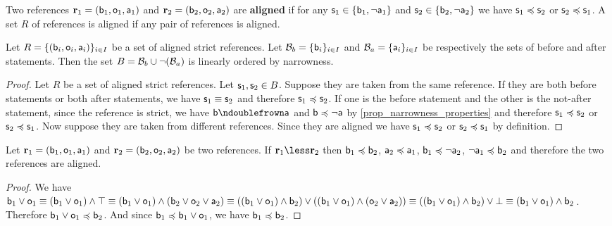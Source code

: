 \documentclass[11pt,letterpaper,fleqn]{memoir} %
\begin{document}
\begin{mathSection}
\begin{defn}
	Two references $\refStmt_1 = (\stmt[b]_1, \stmt[o]_1, \stmt[a]_1)$ and $\refStmt_2 = (\stmt[b]_2, \stmt[o]_2, \stmt[a]_2)$ are \textbf{aligned} if for any $\stmt_1 \in \{ \stmt[b]_1, \NOT\stmt[a]_1\}$ and $\stmt_2 \in \{ \stmt[b]_2, \NOT\stmt[a]_2\}$ we have 
	$\stmt_1 \narrower \stmt_2$ or $\stmt_2 \narrower \stmt_1$. A set $R$ of references is aligned if any pair of references is aligned.
\end{defn}
\begin{prop}\label{3_prop_strict_alignment_is_ordering}
	Let $R = \{(\stmt[b]_i, \stmt[o]_i, \stmt[a]_i)\}_{i\in I}$ be a set of aligned strict references. Let $\basis_b = \{\stmt[b]_i\}_{i\in I}$ and $\basis_a = \{\stmt[a]_i\}_{i\in I}$ be respectively the sets of before and after statements. Then the set $B = \basis_b \cup \NOT (\basis_a)$ is linearly ordered by narrowness.
\end{prop}
\begin{proof}
	Let $R$ be a set of aligned strict references. Let $\stmt_1, \stmt_2 \in B$. Suppose they are taken from the same reference. If they are both before statements or both after statements, we have $\stmt_1 \equiv \stmt_2$ and therefore $\stmt_1 \narrower \stmt_2$. If one is the before statement and the other is the not-after statement, since the reference is strict, we have $\stmt[b] \ncomp \stmt[a]$ and $\stmt[b] \narrower \NOT\stmt[a]$ by \ref{prop_narrowness_properties} and therefore $\stmt_1 \narrower \stmt_2$ or $\stmt_2 \narrower \stmt_1$. Now suppose they are taken from different references. Since they are aligned we have  $\stmt_1 \narrower \stmt_2$ or $\stmt_2 \narrower \stmt_1$ by definition.
\end{proof}

\begin{prop}\label{3_prop_ordered_references_are_aligned}
	Let $\refStmt_1 = ( \stmt[b]_1, \stmt[o]_1, \stmt[a]_1 )$ and $\refStmt_2 = ( \stmt[b]_2, \stmt[o]_2, \stmt[a]_2 )$ be two references. If $\refStmt_1 \less \refStmt_2$ then $\stmt[b]_1 \narrower \stmt[b]_2$, $\stmt[a]_2 \narrower \stmt[a]_1$, $\stmt[b]_1 \narrower \NOT \stmt[a]_2$, $\NOT \stmt[a]_1 \narrower \stmt[b]_2$ and therefore the two references are aligned.
\end{prop}
\begin{proof}
	We have $\stmt[b]_1 \OR \stmt[o]_1 \equiv (\stmt[b]_1 \OR \stmt[o]_1) \AND \tautology \equiv (\stmt[b]_1 \OR \stmt[o]_1) \AND (\stmt[b]_2 \OR \stmt[o]_2 \OR \stmt[a]_2) \equiv ((\stmt[b]_1 \OR \stmt[o]_1) \AND \stmt[b]_2) \OR ((\stmt[b]_1 \OR \stmt[o]_1) \AND (\stmt[o]_2 \OR \stmt[a]_2)) \equiv ((\stmt[b]_1 \OR \stmt[o]_1) \AND \stmt[b]_2) \OR \contradiction \equiv (\stmt[b]_1 \OR \stmt[o]_1) \AND \stmt[b]_2$. Therefore $\stmt[b]_1 \OR \stmt[o]_1 \narrower \stmt[b]_2$. And since $\stmt[b]_1 \narrower \stmt[b]_1 \OR \stmt[o]_1$, we have $\stmt[b]_1 \narrower \stmt[b]_2$.
	

\end{proof}
\end{mathSection}
\end{document}
